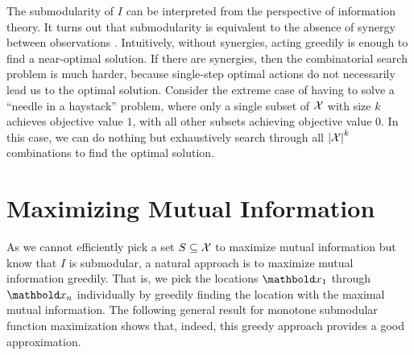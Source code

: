 The submodularity of $I$ can be interpreted from the perspective of information theory.
It turns out that submodularity is equivalent to the absence of synergy between observations .
Intuitively, without synergies, acting greedily is enough to find a near-optimal solution.
If there are synergies, then the combinatorial search problem is much harder, because single-step optimal actions do not necessarily lead us to the optimal solution.
Consider the extreme case of having to solve a ``needle in a haystack'' problem, where only a single subset of $\mathcal{X}$ with size $k$ achieves objective value $1$, with all other subsets achieving objective value $0$.
In this case, we can do nothing but exhaustively search through all $\left| \mathcal{X} \right|^k$ combinations to find the optimal solution.

\section{Maximizing Mutual Information}

As we cannot efficiently pick a set $S \subseteq \mathcal{X}$ to maximize mutual information but know that $I$ is submodular, a natural approach is to maximize mutual information greedily.
That is, we pick the locations $\vx_1$ through $\vx_n$ individually by greedily finding the location with the maximal mutual information.
The following general result for monotone submodular function maximization shows that, indeed, this greedy approach provides a good approximation.

